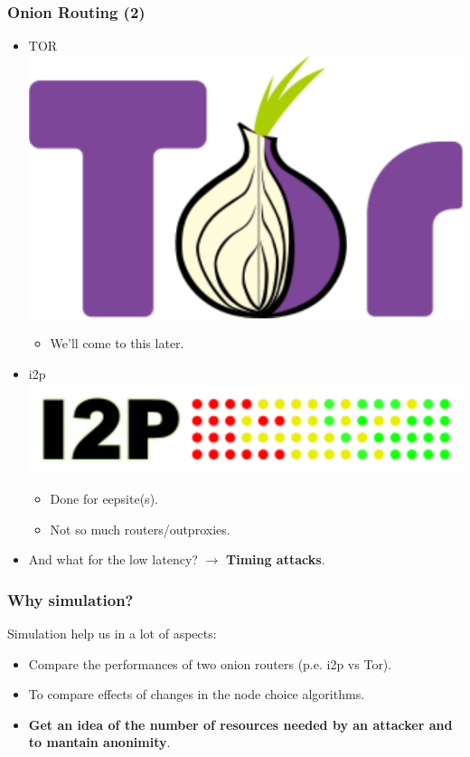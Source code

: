 \begin{frame}
	\frametitle{Onion Routing (2)}

	\begin{itemize}
		\item TOR \includegraphics[scale=0.1]{imgs/Tor_logo}
		\begin{itemize}
			\item We'll come to this later.
		\end{itemize}
		\item i2p \includegraphics[scale=0.2]{imgs/I2P_logo}
		\begin{itemize}
			\item Done for eepsite(s).
			\item Not so much routers/outproxies.
		\end{itemize}
	\end{itemize}
	\begin{itemize}
		\item And what for the low latency? $\to$ \textbf{Timing attacks}.
	\end{itemize}
\end{frame}

\begin{frame}
	\frametitle{Why simulation?}
	Simulation help us in a lot of aspects:

	\begin{itemize}
		\item Compare the performances of two onion routers (p.e. i2p vs
		Tor).
		\item To compare effects of changes in the node choice
		algorithms.
		\item \textbf{Get an idea of the number of resources needed by an
		attacker and to mantain anonimity}.
	\end{itemize}
\end{frame}

